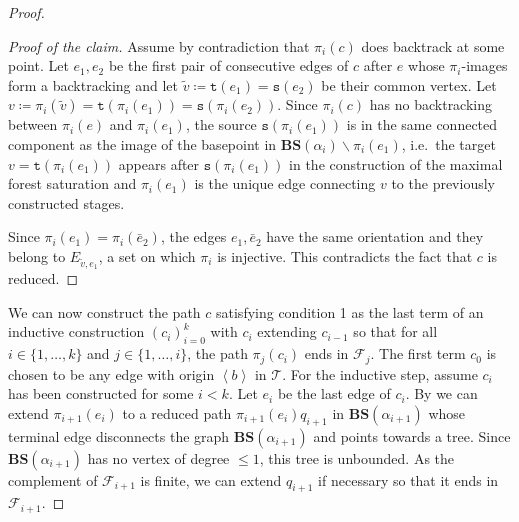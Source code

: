 \documentclass[12pt]{article}
\numberwithin{equation}{section}
\theoremstyle{definition}
\newenvironment{cproof}{\begin{proof}[Proof of the
        claim]\renewcommand*{\qedsymbol}{\(\square_\text{claim}\)}}{\end{proof}}
\newcommand{\la}{\left\langle}
\newcommand{\ra}{\right\rangle}
\newcommand\BSe{\mathbf{BS}}
\newcommand\Tree{\mathcal{T}}
\newcommand{\source}{\mathtt{s}}
\newcommand{\target}{\mathtt{t}}
\newcommand\pathinT{c}
\begin{document}
\begin{proof}
\begin{cproof}
                Assume by contradiction that $\pi_i(\pathinT)$ does backtrack at some point.
                Let $e_1, e_2$ be the first pair of consecutive edges of $\pathinT$ after $e$ whose $\pi_i$-images form a backtracking and 
                let $\tilde v \coloneqq \target(e_1) = \source(e_2)$ be their common vertex. 
                Let $v \coloneqq \pi_i(\tilde v)=\target(\pi_i(e_1)) = \source(\pi_i(e_2))$. 
                Since $\pi_i(\pathinT)$ has no backtracking between $\pi_i(e)$ and $\pi_i(e_1)$,
                the source $\source (\pi_i(e_1))$ is in the same connected component as the image of the basepoint in $\BSe(\alpha_i)\smallsetminus  \pi_i(e_1)$, 
                i.e.\ the target $v = \target (\pi_i(e_1))$ appears after $\source (\pi_i(e_1))$ in the construction of the maximal forest saturation
                and $\pi_i(e_1)$ is the unique edge connecting $v$ to the previously constructed stages.
                
                Since $\pi_i(e_1)=\pi_i(\bar e_2)$, the edges $e_1,\bar e_2$ have the same orientation 
                and they belong to $E_{\tilde v, e_1}$, a set on which $\pi_i$ is injective.
                This contradicts the fact that $\pathinT$ is reduced. 
            \end{cproof} 



            We can now construct 
            the path $\pathinT$ satisfying condition 1 as the last term of an inductive construction $(\pathinT_i)_{i=0}^{k}$ with $\pathinT_{i}$ extending $\pathinT_{i-1}$
            so that for all
            $i\in \{1, \dots, k\}$ and $j\in \{1, \ldots, i\}$, the path $\pi_j(\pathinT_i)$ ends in $\mathcal F_j$.
            The first term $\pathinT_0$ is chosen to be any edge with origin $\la b \ra$ in $\Tree$.
            For the inductive step, assume $\pathinT_i$ has been constructed for some  $i< k$. 
            Let $e_i$ be the last edge of $\pathinT_i$.
            By \cite[Lemma 2.17]{fima_characterization_HT_2022}
            we can extend $\pi_{i+1}(e_i)$ to a reduced path $\pi_{i+1}(e_i) q_{i+1}$ in $\BSe(\alpha_{i+1})$ 
            whose terminal edge disconnects the graph $\BSe(\alpha_{i+1})$ and points towards a tree.
            Since $\BSe(\alpha_{i+1})$ has no vertex of degree $\leq 1$, this tree is unbounded. 
            As the complement of $\mathcal{F}_{i+1}$ is finite, we can extend $q_{i+1}$ if necessary so that it ends in $\mathcal{F}_{i+1}$.
            

\end{proof}
\end{document}
